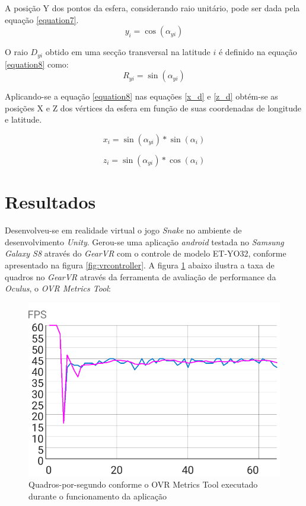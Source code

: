 \documentclass[conference]{IEEEtran}
\begin{document}
A posição Y dos pontos da esfera, considerando raio unitário, pode ser dada pela equação \ref{equation7}.
\begin{equation}
y_{i} = \cos(\alpha_{yi})
\label{equation7}
\end{equation}

O raio $D_{yi}$ obtido em uma secção transversal na latitude $i$ é definido na equação \ref{equation8} como:
\begin{equation}
R_{yi} = \sin(\alpha_{yi})
\label{equation8}
\end{equation}

Aplicando-se a equação \ref{equation8} nas equações \ref{x_d} e \ref{z_d} obtém-se as posições X e Z dos vértices da esfera em função de suas coordenadas de longitude e latitude.

\begin{equation}
x_{i} = \sin(\alpha_{yi}) * \sin(\alpha_i)
\label{equation9}
\end{equation}

\begin{equation}
z_{i} = \sin(\alpha_{yi}) * \cos(\alpha_i)
\label{equation10}
\end{equation}

\section{Resultados} \label{sec:results}
Desenvolveu-se em realidade virtual o jogo \textit{Snake} no ambiente de desenvolvimento \textit{Unity}. Gerou-se uma aplicação \textit{android} testada no \textit{Samsung Galaxy S8} através do \textit{GearVR} com o controle de modelo ET-YO32, conforme apresentado na figura \ref{fig:vrcontroller}. A figura \ref{fig:VRPerformanceChart} abaixo ilustra a taxa de quadros no \textit{GearVR} através da ferramenta de avaliação de performance da \textit{Oculus}, o \textit{OVR Metrics Tool}:

\begin{figure}[H] \label{fig:VRPerformanceChart}
\centering
\includegraphics[scale=0.5]{VRPerformance}
\caption{Quadros-por-segundo conforme o OVR Metrics Tool executado durante o funcionamento da aplicação }
\end{figure}
\end{document}
